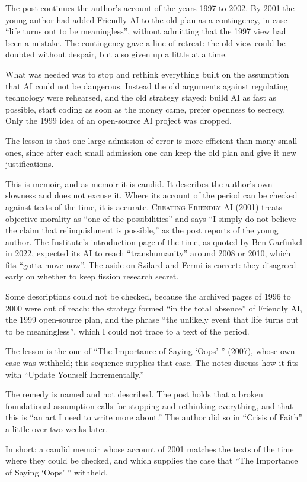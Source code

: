 \begin{afterword}
\summaryhead

The post continues the author's account of the years 1997 to 2002. By 2001 the young author had added Friendly AI to the old plan as a contingency, in case ``life turns out to be meaningless'', without admitting that the 1997 view had been a mistake. The contingency gave a line of retreat: the old view could be doubted without despair, but also given up a little at a time.

What was needed was to stop and rethink everything built on the assumption that AI could not be dangerous. Instead the old arguments against regulating technology were rehearsed, and the old strategy stayed: build AI as fast as possible, start coding as soon as the money came, prefer openness to secrecy. Only the 1999 idea of an open-source AI project was dropped.

The lesson is that one large admission of error is more efficient than many small ones, since after each small admission one can keep the old plan and give it new justifications.

\responsehead

This is memoir, and as memoir it is candid. It describes the author's own slowness and does not excuse it. Where its account of the period can be checked against texts of the time, it is accurate. \textsc{Creating Friendly AI} (2001) treats objective morality as ``one of the possibilities'' and says ``I simply do not believe the claim that relinquishment is possible,'' as the post reports of the young author. The Institute's introduction page of the time, as quoted by Ben Garfinkel in 2022, expected its AI to reach ``transhumanity'' around 2008 or 2010, which fits ``gotta move now''. The aside on Szilard and Fermi is correct: they disagreed early on whether to keep fission research secret.

Some descriptions could not be checked, because the archived pages of 1996 to 2000 were out of reach: the strategy formed ``in the total absence'' of Friendly AI, the 1999 open-source plan, and the phrase ``the unlikely event that life turns out to be meaningless'', which I could not trace to a text of the period.

The lesson is the one of ``The Importance of Saying `Oops' '' (2007), whose own case was withheld; this sequence supplies that case. The notes discuss how it fits with ``Update Yourself Incrementally.''

The remedy is named and not described. The post holds that a broken foundational assumption calls for stopping and rethinking everything, and that this is ``an art I need to write more about.'' The author did so in ``Crisis of Faith'' a little over two weeks later.

In short: a candid memoir whose account of 2001 matches the texts of the time where they could be checked, and which supplies the case that ``The Importance of Saying `Oops' '' withheld.
\end{afterword}
